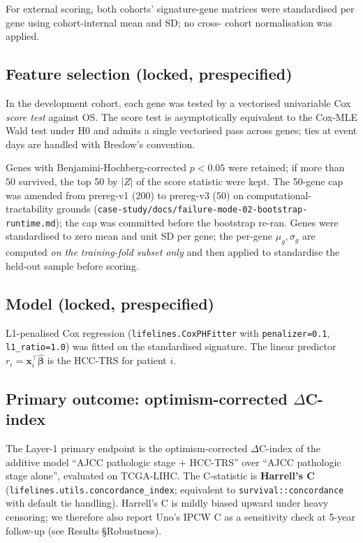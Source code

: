 \documentclass[12pt]{article}
\newcommand{\HCCRTS}{HCC-TRS\xspace}
\begin{document}
For external scoring, both cohorts' signature-gene matrices were
standardised per gene using cohort-internal mean and SD; no cross-
cohort normalisation was applied.

\subsection{Feature selection (locked, prespecified)}

In the development cohort, each gene was tested by a vectorised
univariable Cox \emph{score test} against OS\citep{cox1972regression}.
The score test is asymptotically equivalent to the Cox-MLE Wald test
under H0 and admits a single vectorised pass across genes; ties at
event days are handled with Breslow's convention.

Genes with Benjamini-Hochberg-corrected $p<0.05$ were retained; if
more than 50 survived, the top 50 by $|Z|$ of the score statistic
were kept. The 50-gene cap was amended from prereg-v1 (200) to
prereg-v3 (50) on computational-tractability grounds
(\texttt{case-study/docs/failure-mode-02-bootstrap-runtime.md}); the
cap was committed before the bootstrap re-ran. Genes were standardised
to zero mean and unit SD per gene; the per-gene $\mu_g, \sigma_g$ are
computed \emph{on the training-fold subset only} and then applied to
standardise the held-out sample before scoring.

\subsection{Model (locked, prespecified)}

L1-penalised Cox regression (\texttt{lifelines.CoxPHFitter} with
\texttt{penalizer=0.1}, \texttt{l1\_ratio=1.0}\citep{simon2011regularization,davidson2019lifelines})
was fitted on the standardised signature. The linear predictor
$r_i = \mathbf{x}_i^\top \hat{\boldsymbol{\beta}}$ is the \HCCRTS for
patient $i$.

\subsection{Primary outcome: optimism-corrected $\Delta$C-index}

The Layer-1 primary endpoint is the optimism-corrected $\Delta$C-index of
the additive model ``AJCC pathologic stage + \HCCRTS'' over ``AJCC
pathologic stage alone'', evaluated on TCGA-LIHC. The C-statistic
is \textbf{Harrell's C} (\texttt{lifelines.utils.concordance\_index};
equivalent to \texttt{survival::concordance} with default tie
handling). Harrell's C is mildly biased upward under heavy
censoring\citep{uno2011c}; we therefore also report Uno's IPCW C as
a sensitivity check at 5-year follow-up (see Results §Robustness).
\end{document}
